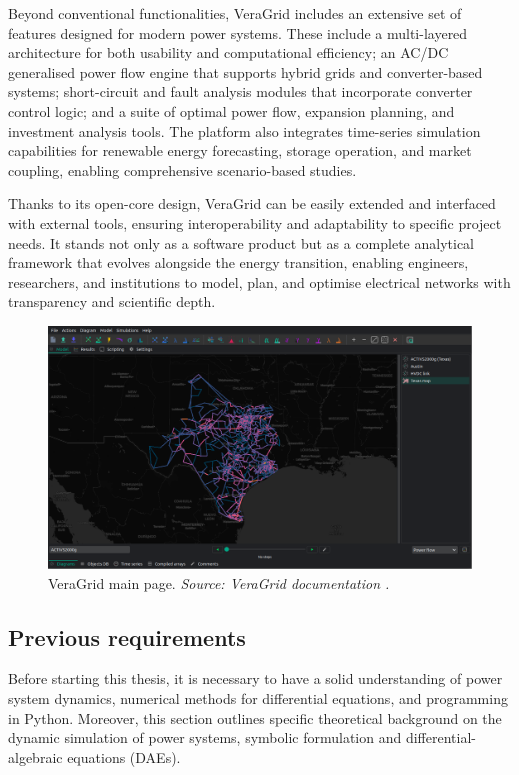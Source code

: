Beyond conventional functionalities, VeraGrid includes an extensive set of features designed for modern power systems. 
These include a multi-layered architecture for both usability and computational efficiency; an AC/DC generalised power flow engine that supports hybrid 
grids and converter-based systems; short-circuit and fault analysis modules that incorporate converter control logic; and a suite of optimal power flow, expansion planning, 
and investment analysis tools. The platform also integrates time-series simulation capabilities for renewable energy forecasting, storage operation, and market coupling, 
enabling comprehensive scenario-based studies. 

Thanks to its open-core design, VeraGrid can be easily extended and interfaced with external tools, ensuring interoperability and adaptability to specific project needs. 
It stands not only as a software product but as a complete analytical framework that evolves alongside the energy transition, enabling engineers, researchers, and institutions 
to model, plan, and optimise electrical networks with transparency and scientific depth.

\begin{figure}
  \centering
  \includegraphics[width=0.8\linewidth]{figures/VeraGrid_main_page.png}
  \caption{VeraGrid main page. \textit{Source: VeraGrid documentation \cite{veragrid}.}}
  \label{fig:VeraGrid_main}
\end{figure}


\subsection{Previous requirements}

Before starting this thesis, it is necessary to have a solid understanding of power system dynamics, numerical methods for differential equations,
and programming in Python. Moreover, this section outlines specific theoretical background on the dynamic simulation of power systems, symbolic formulation and
differential-algebraic equations (DAEs). 

